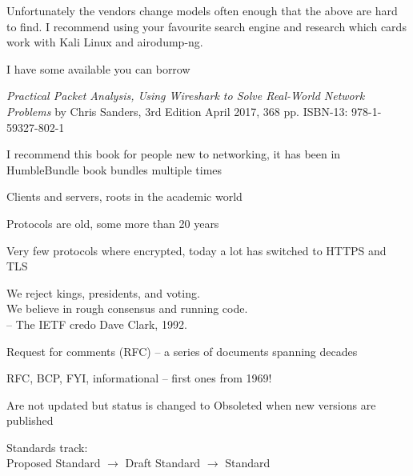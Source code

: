 \documentclass[Screen16to9,17pt]{foils}
\begin{document}
Unfortunately the vendors change models often enough that the above are hard to find. I recommend using your favourite search engine and research which cards work with Kali Linux and airodump-ng.

I have some available you can borrow





\emph{Practical Packet Analysis,
Using Wireshark to Solve Real-World Network Problems}
by Chris Sanders, 3rd Edition
April 2017, 368 pp.
ISBN-13:
978-1-59327-802-1

I recommend this book for people new to networking, it has been in HumbleBundle book bundles multiple times





\begin{list1}
\item Clients and servers, roots in the academic world
\item Protocols are old, some more than 20 years
\item Very few protocols where encrypted, today a lot has switched to HTTPS and TLS
\end{list1}


{\hlkbig \color{titlecolor}
We reject kings, presidents, and voting.\\
We believe in rough consensus and running code.\\
-- The IETF credo Dave Clark, 1992.}

\begin{list1}
\item Request for comments (RFC) -- a series of documents spanning decades
\item RFC, BCP, FYI, informational -- first ones from 1969!
\item Are not updated but status is changed to Obsoleted when new versions are published
\item Standards track:\\
Proposed Standard $\rightarrow$ Draft Standard $\rightarrow$ Standard
\end{list1}

\end{document}
